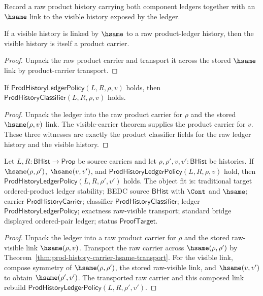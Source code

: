 \begin{definition}
\label{def:prod-ledger-policy}
Record a raw product history carrying both component ledgers together with an
$\hsame$ link to the visible history exposed by the ledger.
\end{definition}

\begin{theorem}
\label{thm:prod-ledger-visible-carrier}
If a visible history is linked by $\hsame$ to a raw product-ledger history,
then the visible history is itself a product carrier.
\end{theorem}
\begin{proof}
Unpack the raw product carrier and transport it across the stored $\hsame$
link by product-carrier transport.
\end{proof}

\begin{theorem}
\label{thm:prod-ledger-raw-visible-classifier}
If $\mathsf{ProdHistoryLedgerPolicy}(L,R,\rho,v)$ holds, then
$\mathsf{ProdHistoryClassifier}(L,R,\rho,v)$ holds.
\end{theorem}
\begin{proof}
Unpack the ledger into the raw product carrier for $\rho$ and the stored
$\hsame(\rho,v)$ link. The visible-carrier theorem supplies the product
carrier for $v$. These three witnesses are exactly the product classifier
fields for the raw ledger history and the visible history.
\end{proof}

\begin{theorem}
\label{thm:prod-ledger-hsame-transport}
Let $L,R:\mathsf{BHist}\to\mathsf{Prop}$ be source carriers and let
$\rho,\rho',v,v':\mathsf{BHist}$ be histories. If $\hsame(\rho,\rho')$,
$\hsame(v,v')$, and $\mathsf{ProdHistoryLedgerPolicy}(L,R,\rho,v)$ hold, then
$\mathsf{ProdHistoryLedgerPolicy}(L,R,\rho',v')$ holds. The object fit is:
traditional target ordered-product ledger stability; BEDC source
$\mathsf{BHist}$ with $\Cont$ and $\hsame$; carrier
$\mathsf{ProdHistoryCarrier}$; classifier $\mathsf{ProdHistoryClassifier}$;
ledger $\mathsf{ProdHistoryLedgerPolicy}$; exactness raw-visible transport;
standard bridge displayed ordered-pair ledger; status $\mathsf{ProofTarget}$.
\end{theorem}
\begin{proof}
Unpack the ledger into a raw product carrier for $\rho$ and the stored
raw-visible link $\hsame(\rho,v)$. Transport the raw carrier across
$\hsame(\rho,\rho')$ by Theorem~\ref{thm:prod-history-carrier-hsame-transport}.
For the visible link, compose symmetry of $\hsame(\rho,\rho')$, the stored
raw-visible link, and $\hsame(v,v')$ to obtain $\hsame(\rho',v')$. The
transported raw carrier and this composed link rebuild
$\mathsf{ProdHistoryLedgerPolicy}(L,R,\rho',v')$.
\end{proof}

